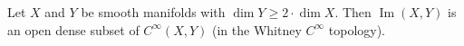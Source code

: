 Let $X$ and $Y$ be smooth manifolds with $\dim Y \geq 2 \cdot \dim X$. Then $\operatorname{Im}(X, Y)$ is an open dense subset of $C^\infty(X, Y)$ (in the Whitney $C^\infty$ topology).
